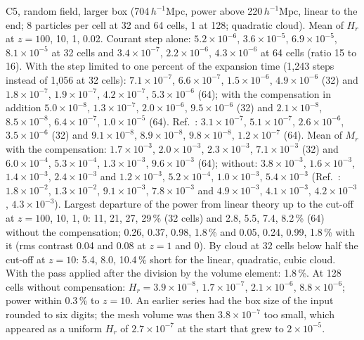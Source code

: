 \documentclass[aps,prd,twocolumn,10pt,superscriptaddress,nofootinbib,longbibliography,floatfix]{revtex4-2}
\begin{document}
C5, random field, larger box (704\,$h^{-1}$Mpc, power above 220\,$h^{-1}$Mpc, linear to the end; 8 particles per cell at 32 and 64 cells, 1 at 128; quadratic cloud). Mean of $H_r$ at $z = 100$, 10, 1, 0.02. Courant step alone: $5.2\times10^{-6}$, $3.6\times10^{-5}$, $6.9\times10^{-5}$, $8.1\times10^{-5}$ at 32 cells and $3.4\times10^{-7}$, $2.2\times10^{-6}$, $4.3\times10^{-6}$ at 64 cells (ratio 15 to 16). With the step limited to one percent of the expansion time (1,243 steps instead of 1,056 at 32 cells): $7.1\times10^{-7}$, $6.6\times10^{-7}$, $1.5\times10^{-6}$, $4.9\times10^{-6}$ (32) and $1.8\times10^{-7}$, $1.9\times10^{-7}$, $4.2\times10^{-7}$, $5.3\times10^{-6}$ (64); with the compensation in addition $5.0\times10^{-8}$, $1.3\times10^{-7}$, $2.0\times10^{-6}$, $9.5\times10^{-6}$ (32) and $2.1\times10^{-8}$, $8.5\times10^{-8}$, $6.4\times10^{-7}$, $1.0\times10^{-5}$ (64). Ref.~\cite{Daverio:2019gql}: $3.1\times10^{-7}$, $5.1\times10^{-7}$, $2.6\times10^{-6}$, $3.5\times10^{-6}$ (32) and $9.1\times10^{-8}$, $8.9\times10^{-8}$, $9.8\times10^{-8}$, $1.2\times10^{-7}$ (64). Mean of $M_r$ with the compensation: $1.7\times10^{-3}$, $2.0\times10^{-3}$, $2.3\times10^{-3}$, $7.1\times10^{-3}$ (32) and $6.0\times10^{-4}$, $5.3\times10^{-4}$, $1.3\times10^{-3}$, $9.6\times10^{-3}$ (64); without: $3.8\times10^{-3}$, $1.6\times10^{-3}$, $1.4\times10^{-3}$, $2.4\times10^{-3}$ and $1.2\times10^{-3}$, $5.2\times10^{-4}$, $1.0\times10^{-3}$, $5.4\times10^{-3}$ (Ref.~\cite{Daverio:2019gql}: $1.8\times10^{-2}$, $1.3\times10^{-2}$, $9.1\times10^{-3}$, $7.8\times10^{-3}$ and $4.9\times10^{-3}$, $4.1\times10^{-3}$, $4.2\times10^{-3}$, $4.3\times10^{-3}$). Largest departure of the power from linear theory up to the cut-off at $z = 100$, 10, 1, 0: 11, 21, 27, 29\,\% (32 cells) and 2.8, 5.5, 7.4, 8.2\,\% (64) without the compensation; 0.26, 0.37, 0.98, 1.8\,\% and 0.05, 0.24, 0.99, 1.8\,\% with it (rms contrast 0.04 and 0.08 at $z = 1$ and 0). By cloud at 32 cells below half the cut-off at $z = 10$: 5.4, 8.0, 10.4\,\% short for the linear, quadratic, cubic cloud. With the pass applied after the division by the volume element: 1.8\,\%. At 128 cells without compensation: $H_r = 3.9\times10^{-8}$, $1.7\times10^{-7}$, $2.1\times10^{-6}$, $8.8\times10^{-6}$; power within 0.3\,\% to $z = 10$. An earlier series had the box size of the input rounded to six digits; the mesh volume was then $3.8\times10^{-7}$ too small, which appeared as a uniform $H_r$ of $2.7\times10^{-7}$ at the start that grew to $2\times10^{-5}$.
\end{document}
